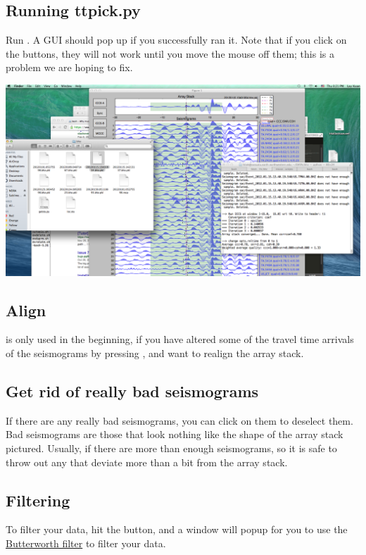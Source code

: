 \documentclass[letterpaper,10pt,english]{sphinxmanual}
\begin{document}
\subsection{Running ttpick.py}
\label{docfiles/PickingTravelTimes:running-ttpick-py}
Run . A GUI should pop up if you successfully ran it. Note that if you click on the buttons, they will not work until you move the mouse off them; this is a problem we are hoping to fix.

\includegraphics{pick_travel_times.png}


\subsection{Align}
\label{docfiles/PickingTravelTimes:align}
 is only used in the beginning, if you have altered some of the travel time arrivals of the seismograms by pressing , and want to realign the array stack.


\subsection{Get rid of really bad seismograms}
\label{docfiles/PickingTravelTimes:get-rid-of-really-bad-seismograms}
If there are any really bad seismograms, you can click on them to deselect them. Bad seismograms are those that look nothing like the shape of the array stack pictured. Usually, if there are more than enough seismograms, so it is safe to throw out any that deviate more than a bit from the array stack.


\subsection{Filtering}
\label{docfiles/PickingTravelTimes:filtering}
To filter your data, hit the  button, and a window will popup for you to use the \href{http://en.wikipedia.org/wiki/Butterworth\_filter}{Butterworth filter} to filter your data.
\end{document}
